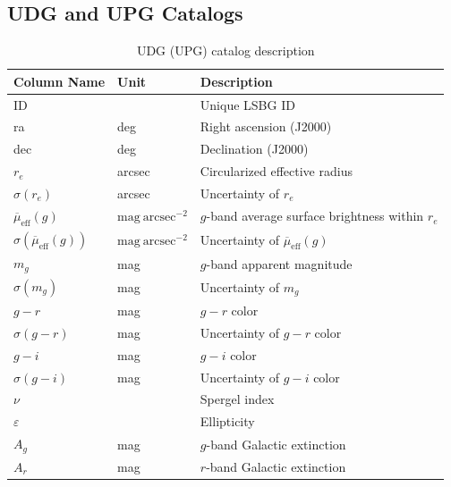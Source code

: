 \documentclass[twocolumn,astrosymb,twocolappendix]{aastex631}
\newcommand{\sbunit}{\mathrm{mag\ arcsec}^{-2}}
\begin{document}
\begin{CJK*}{UTF8}{gbsn}
\section{UDG and UPG Catalogs}
\onecolumngrid 

\begin{table}
\caption{UDG (UPG) catalog description} 
\label{tab:catalog}
\begin{center}
\begin{tabular}{l l l}
\hline\hline
Column Name      & Unit    & Description                    \\
\hline
ID                       &         & Unique LSBG ID \\
ra                       & deg     & Right ascension (J2000) \\
dec                      & deg     & Declination (J2000) \\
$r_e$         & arcsec  & Circularized effective radius  \\
$\sigma(r_e)$ & arcsec  & Uncertainty of $r_e$ \\
$\overline{\mu}_{\mathrm{eff}}(g)$               & $\sbunit$ & $g$-band average surface brightness within $r_e$ \\
$\sigma(\overline{\mu}_{\mathrm{eff}}(g))$       & $\sbunit$ & Uncertainty of $\overline{\mu}_{\mathrm{eff}}(g)$           \\
$m_g$                    & mag     & $g$-band apparent magnitude     \\
$\sigma(m_g)$            & mag     & Uncertainty of $m_g$            \\
$g-r$                    & mag     & $g-r$ color                     \\
$\sigma(g-r)$            & mag     & Uncertainty of $g-r$ color      \\
$g-i$                    & mag     & $g-i$ color                     \\
$\sigma(g-i)$            & mag     & Uncertainty of $g-i$ color      \\
$\nu$                    &         & Spergel index              \\
$\varepsilon$            &         & Ellipticity                     \\
$A_g$                    & mag     & $g$-band Galactic extinction \\
$A_r$                    & mag     & $r$-band Galactic extinction \\

\end{tabular}
\end{center}
\end{table}
\end{CJK*}
\end{document}
